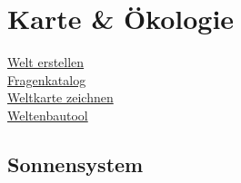 \chapter{Karte \& Ökologie}
\href{http://www.weltenbau-wissen.de/sci-fi-erschaffen-fantasy-welt-erstellen-einstieg/}{Welt erstellen} \\
\href{http://www.weltenbau-wissen.de/2015/10/weltenbau-fragenkatalog-oekologie-biologie/}{Fragenkatalog} \\
\href{http://www.weltenbau-wissen.de/2015/01/weltenbau-mit-weltkarte-karte-zeichnen-tutorial/}{Weltkarte zeichnen} \\
\href{https://inkarnate.com/}{Weltenbautool}

\section{Sonnensystem}
